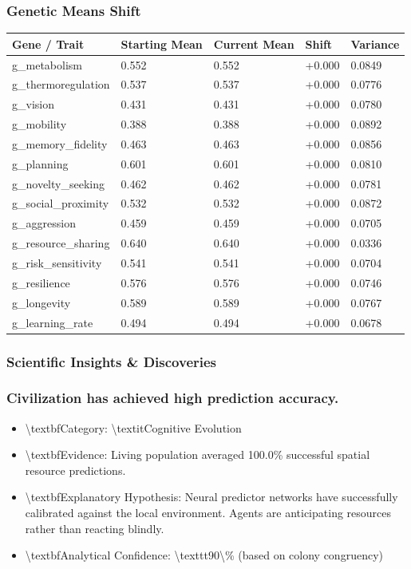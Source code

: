 \documentclass[11pt,a4paper]{article}
\begin{document}
\subsubsection*{ Genetic Means Shift}
\begin{longtable}{lllll}
\toprule
Gene / Trait & Starting Mean & Current Mean & Shift & Variance \\
\midrule
\endhead
g\_metabolism & 0.552 & 0.552 & +0.000 & 0.0849 \\
g\_thermoregulation & 0.537 & 0.537 & +0.000 & 0.0776 \\
g\_vision & 0.431 & 0.431 & +0.000 & 0.0780 \\
g\_mobility & 0.388 & 0.388 & +0.000 & 0.0892 \\
g\_memory\_fidelity & 0.463 & 0.463 & +0.000 & 0.0856 \\
g\_planning & 0.601 & 0.601 & +0.000 & 0.0810 \\
g\_novelty\_seeking & 0.462 & 0.462 & +0.000 & 0.0781 \\
g\_social\_proximity & 0.532 & 0.532 & +0.000 & 0.0872 \\
g\_aggression & 0.459 & 0.459 & +0.000 & 0.0705 \\
g\_resource\_sharing & 0.640 & 0.640 & +0.000 & 0.0336 \\
g\_risk\_sensitivity & 0.541 & 0.541 & +0.000 & 0.0704 \\
g\_resilience & 0.576 & 0.576 & +0.000 & 0.0746 \\
g\_longevity & 0.589 & 0.589 & +0.000 & 0.0767 \\
g\_learning\_rate & 0.494 & 0.494 & +0.000 & 0.0678 \\
\bottomrule
\end{longtable}

\subsubsection*{ Scientific Insights \& Discoveries}
\subsubsection*{ Civilization has achieved high prediction accuracy.}
\begin{itemize}
  \item \textbackslash{}textbf{Category:} \textbackslash{}textit{Cognitive Evolution}
  \item \textbackslash{}textbf{Evidence:} Living population averaged 100.0\% successful spatial resource predictions.
  \item \textbackslash{}textbf{Explanatory Hypothesis:} Neural predictor networks have successfully calibrated against the local environment. Agents are anticipating resources rather than reacting blindly.
  \item \textbackslash{}textbf{Analytical Confidence:} \textbackslash{}texttt{90\textbackslash{}\%} (based on colony congruency)
\end{itemize}
\end{document}
